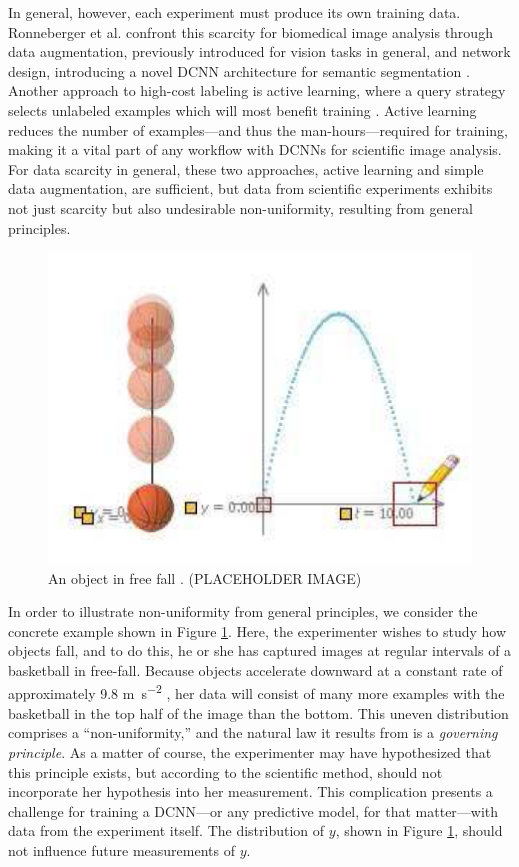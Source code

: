 \documentclass[10pt, journal]{IEEEtran}
\begin{document}
In general, however, each experiment must produce its own training
data. Ronneberger et al. confront this scarcity for biomedical image analysis
through data augmentation, previously introduced for vision tasks in general,
and network design, introducing a novel DCNN architecture for semantic
segmentation \cite{krizhevsky_imagenet_2012, ronneberger_u-net:_2015}. Another
approach to high-cost labeling is active learning, where a query strategy
selects unlabeled examples which will most benefit training
\cite{settles_active_2012}. Active learning reduces the number of examples---and
thus the man-hours---required for training, making it a vital part of any
workflow with DCNNs for scientific image analysis. For data scarcity in general,
these two approaches, active learning and simple data augmentation, are
sufficient, but data from scientific experiments exhibits not just scarcity but
also undesirable non-uniformity, resulting from general principles.

\begin{figure}
  \centering
  \includegraphics[width=\linewidth]{free_fall}
  \caption{An object in free fall \cite{duquevieira_simple_2012}. (PLACEHOLDER
    IMAGE)}
  \label{fig:free-fall}
\end{figure}

In order to illustrate non-uniformity from general principles, we consider the
concrete example shown in Figure \ref{fig:free-fall}. Here, the experimenter
wishes to study how objects fall, and to do this, he or she has captured images
at regular intervals of a basketball in free-fall. Because objects accelerate
downward at a constant rate of approximately 9.8 \si{\meter\per\second^2}
\cite{munroe_wikipedian_nodate}, her data will consist of many more examples
with the basketball in the top half of the image than the bottom. This uneven
distribution comprises a ``non-uniformity,'' and the natural law it results from
is a \emph{governing principle}. As a matter of course, the experimenter may
have hypothesized that this principle exists, but according to the scientific
method, should not incorporate her hypothesis into her measurement. This
complication presents a challenge for training a DCNN---or any predictive model,
for that matter---with data from the experiment itself. The distribution of $y$,
shown in Figure \ref{fig:free-fall}, should not influence future measurements of
$y$.
\end{document}
